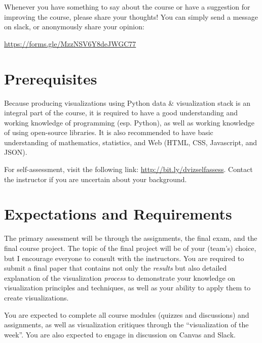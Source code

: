 \documentclass[11pt,article,oneside]{memoir} %
\begin{document}
Whenever you have something to say about the course or have a suggestion for improving the course, please share your thoughts! You can simply send a message on slack, or anonymously share your opinion:

\url{https://forms.gle/MzzNSV6Y8deJWGC77} 

\section{Prerequisites}%
\label{sec:Prerequisites}

Because producing visualizations using Python data \& visualization stack is an integral part of the course, it is required to have a good understanding and working knowledge of programming (esp. Python), as well as working knowledge of using open-source libraries. 
It is also recommended to have basic understanding of mathematics, statistics, and Web (HTML, CSS, Javascript, and JSON). 

For self-assessment, visit the following link: \href{http://bit.ly/dvizselfassess}{http://bit.ly/dvizselfassess}. 
Contact the instructor if you are uncertain about your background. 

\section{Expectations and Requirements}%
\label{sec:requirements}

The primary assessment will be through the assignments, the final exam, and the final course project. 
The topic of the final project will be of your (team's) choice, but I encourage everyone to consult with the instructors. 
You are required to submit a final paper that contains not only the \emph{results} but also detailed explanation of the visualization \emph{process} to demonstrate your knowledge on visualization principles and techniques, as well as your ability to apply them to create visualizations. 

You are expected to complete all course modules (quizzes and discussions) and assignments, as well as visualization critiques through the ``visualization of the week''. You are also expected to engage in discussion on Canvas and Slack. 
\end{document}

